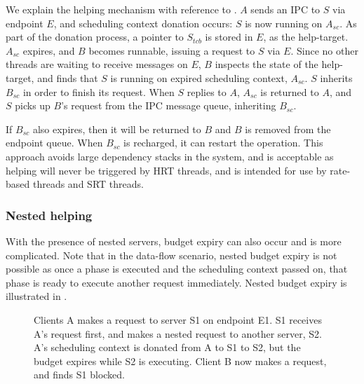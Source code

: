 We explain the helping mechanism with reference to .
$A$ sends an IPC to $S$ via endpoint $E$, and scheduling context donation occurs: $S$ is now running on $A_{sc}$.
As part of the donation process, a pointer to $S_{tcb}$ is stored in $E$, as the help-target.
$A_{sc}$ expires, and $B$ becomes runnable, issuing a request to $S$ via $E$.
Since no other threads are waiting to receive messages on $E$, $B$ inspects the state of the help-target, and finds that $S$ is running on expired scheduling context, $A_{sc}$.
$S$ inherits $B_{sc}$ in order to finish its request.
When $S$ replies to $A$, $A_{sc}$ is returned to $A$, and $S$ picks up $B$'s request from the IPC message queue, inheriting $B_{sc}$.

If $B_{sc}$ also expires, then it will be returned to $B$ and $B$ is removed from the endpoint queue.
When $B_{sc}$ is recharged, it can restart the operation.
This approach avoids large dependency stacks in the system, and is acceptable as helping will never be triggered by \gls{HRT} threads, and is intended for use by rate-based threads and \gls{SRT} threads.

\subsubsection{Nested helping}

With the presence of nested servers, budget expiry can also occur and is more complicated.
Note that in the data-flow scenario, nested budget expiry is not possible as once a phase is executed and the scheduling context passed on, that phase is ready to execute another request immediately.
Nested budget expiry is illustrated in .

\begin{figure}
\centering
\caption{Clients A makes a request to server S1 on endpoint E1. S1 receives A's request first, and makes a nested request to another server, S2. A's scheduling context is donated from A to S1 to S2, but the budget expires while S2 is executing. Client B now makes a request, and finds S1 blocked.}
\label{fig:nested-budget-expiry}
\end{figure}

